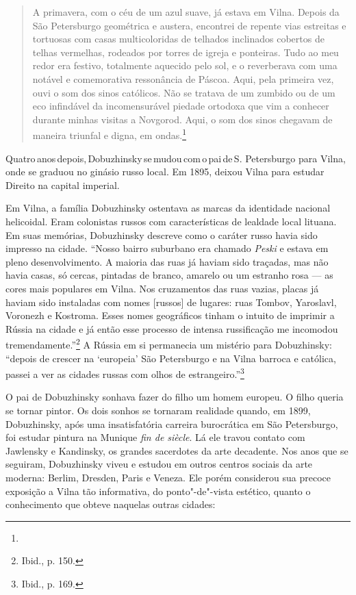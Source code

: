 \begin{quote}
A primavera, com o céu de um azul suave, já estava em Vilna. Depois da
São Petersburgo geométrica e austera, encontrei de repente vias
estreitas e tortuosas com casas multicoloridas de telhados inclinados
cobertos de telhas vermelhas, rodeados por torres de igreja e ponteiras.
Tudo ao meu redor era festivo, totalmente aquecido pelo sol, e o
reverberava com uma notável e comemorativa ressonância de Páscoa. Aqui,
pela primeira vez, ouvi o som dos sinos católicos. Não se tratava de um
zumbido ou de um eco infindável da incomensurável piedade ortodoxa que
vim a conhecer durante minhas visitas a Novgorod. Aqui, o som dos sinos
chegavam de maneira triunfal e digna, em ondas.\footnote{} 
\end{quote}


Quatro\,anos\,depois,\,Dobuzhinsky\,se\,mudou\,com\,o\,pai\,de\,S. Petersburgo %
para Vilna, onde se graduou no ginásio russo local. Em 1895, deixou
Vilna para estudar Direito na capital imperial.

Em Vilna, a família Dobuzhinsky ostentava as marcas da identidade
nacional helicoidal. Eram colonistas russos com características de
lealdade local lituana. Em suas memórias, Dobuzhinsky descreve como o
caráter russo havia sido impresso na cidade. ``Nosso bairro suburbano
era chamado \textit{Peski} e estava em pleno desenvolvimento. A maioria
das ruas já haviam sido traçadas, mas não havia casas, só cercas,
pintadas de branco, amarelo ou um estranho rosa --- as cores mais
populares em Vilna. Nos cruzamentos das ruas vazias, placas já haviam
sido instaladas com nomes {[}russos{]} de lugares: ruas Tombov,
Yaroslavl, Voronezh e Kostroma. Esses nomes geográficos tinham o intuito
de imprimir a Rússia na cidade e já então esse processo de intensa
russificação me incomodou tremendamente.''\footnote{Ibid., p. 150.} A
Rússia em si permanecia um mistério para Dobuzhinsky: ``depois de
crescer na `europeia' São Petersburgo e na Vilna barroca e católica,
passei a ver as cidades russas com olhos de estrangeiro.''\footnote{Ibid., p. 169.}

O pai de Dobuzhinsky sonhava fazer do filho um homem europeu. O filho
queria se tornar pintor. Os dois sonhos se tornaram realidade quando, em
1899, Dobuzhinsky, após uma insatisfatória carreira burocrática em São
Petersburgo, foi estudar pintura na Munique \textit{fin de siècle}. Lá ele
travou contato com Jawlensky e Kandinsky, os grandes sacerdotes da arte
decadente. Nos anos que se seguiram, Dobuzhinsky viveu e estudou em
outros centros sociais da arte moderna: Berlim, Dresden, Paris e Veneza.
Ele porém considerou sua precoce exposição a Vilna tão informativa, do
ponto"-de"-vista estético, quanto o conhecimento que obteve naquelas
outras cidades:

